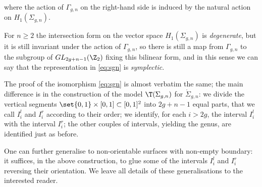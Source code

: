 where the action of $\Gamma_{g,n}$ on the right-hand side is induced by the natural
action on $H_1(\Sigma_{g,n})$.

For $n\geq 2$ the intersection form on the vector space $H_1(\Sigma_{g,n})$
is \emph{degenerate}, but it is still invariant under the action of
$\Gamma_{g,n}$, so there is still a map from $\Gamma_{g,n}$ to the subgroup
of $GL_{2g+n-1}(\Z_2)$ fixing this bilinear form, and in this sense we can say
that the representation in \eqref{eq:sgn} is \emph{symplectic}.

The proof of the isomorphism \eqref{eq:sgn} is almost verbatim the same; the main difference is in the construction of the
model $\T(\Sigma_{g,n})$ for $\mathring{\Sigma}_{g,n}$: we divide the
vertical segments $\set{0,1}\times[0,1]\subset[0,1]^2$
into $2g+n-1$ equal parts, that we call $I_i^l$ and $I_i^r$ according to their order;
we identify, for each $i>2g$, the interval $I_i^l$ with the interval $I_i^r$;
the other couples of intervals, yielding the genus, are identified just as before.

One can further generalise to non-orientable surfaces with non-empty boundary: it suffices,
in the above construction, to glue some of the intervals $I_i^l$ and $I_i^r$ reversing their
orientation. We leave all details of these generalisations to the interested reader.